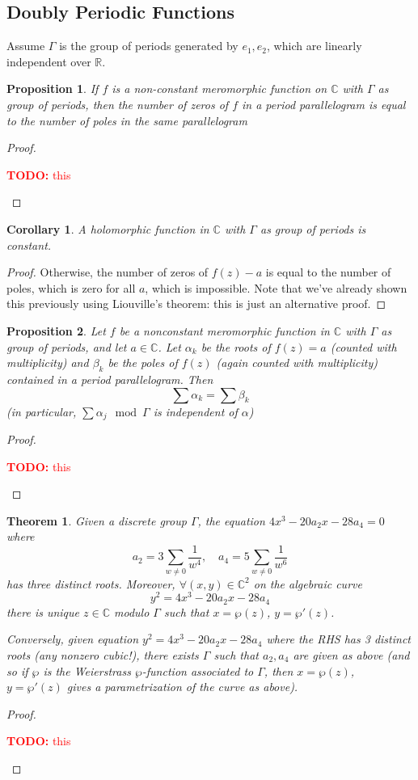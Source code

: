 \documentclass{article}
\newtheorem{theorem}{Theorem}
\newtheorem{corollary}{Corollary}
\newcommand{\mbb}[1]{\mathbb{#1}}
\newcommand{\reals}{\mbb{R}}
\newtheorem{proposition}{Proposition}
\newcommand{\TODO}[1]{\begin{center}\huge{\textcolor{red}{\textbf{TODO:} #1}}\end{center}}
\begin{document}
\subsection{Doubly Periodic Functions}

Assume \(\Gamma\) is the group of periods generated by \(e_1, e_2\), which are linearly independent over \(\reals\).
\begin{proposition}
If \(f\) is a non-constant meromorphic function on \(\mbb{C}\) with \(\Gamma\) as group of periods, then the number of zeros of \(f\) in a period parallelogram is equal to the number of poles in the same parallelogram
\end{proposition}
\begin{proof}
\TODO{this}
\end{proof}
\begin{corollary}
A holomorphic function in \(\mbb{C}\) with \(\Gamma\) as group of periods is constant.
\end{corollary}
\begin{proof}
Otherwise, the number of zeros of \(f(z) - a\) is equal to the number of poles, which is zero for all \(a\), which is impossible. Note that we've already shown this previously using Liouville's theorem: this is just an alternative proof.
\end{proof}
\begin{proposition}
Let \(f\) be a nonconstant meromorphic function in \(\mbb{C}\) with \(\Gamma\) as group of periods, and let \(a \in \mbb{C}\). Let \(\alpha_k\) be the roots of \(f(z) = a\) (counted with multiplicity) and \(\beta_k\) be the poles of \(f(z)\) (again counted with multiplicity) contained in a period parallelogram. Then
\begin{equation}\sum\alpha_k = \sum\beta_k\end{equation}
(in particular, \(\sum\alpha_j \mod \Gamma\) is independent of \(\alpha\))
\end{proposition}
\begin{proof}
\TODO{this}
\end{proof}
\begin{theorem}
Given a discrete group \(\Gamma\), the equation \(4x^3 - 20a_2x - 28a_4 = 0\) where
\begin{equation}a_2 = 3\sum_{w \neq 0}\frac{1}{w^4}, \quad a_4 = 5\sum_{w \neq 0}\frac{1}{w^6}\end{equation}
has three distinct roots. Moreover, \(\forall (x, y) \in \mbb{C}^2\) on the algebraic curve
\begin{equation}y^2 = 4x^3 - 20a_2x - 28a_4\end{equation}
there is unique \(z \in \mbb{C}\) modulo \(\Gamma\) such that \(x = \wp(z)\), \(y = \wp'(z)\).

Conversely, given equation \(y^2 = 4x^3 - 20a_2x - 28a_4\) where the RHS has 3 distinct roots (any nonzero cubic!), there exists \(\Gamma\) such that \(a_2, a_4\) are given as above (and so if \(\wp\) is the Weierstrass \(\wp\)-function associated to \(\Gamma\), then \(x = \wp(z)\), \(y = \wp'(z)\) gives a parametrization of the curve as above).
\end{theorem}
\begin{proof}
\TODO{this}
\end{proof}
\end{document}

